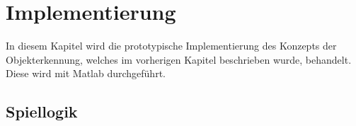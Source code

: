 
\chapter{Implementierung}\label{cha:Implementierung}
In diesem Kapitel wird die prototypische Implementierung des Konzepts der Objekterkennung, welches im vorherigen Kapitel beschrieben wurde, behandelt. Diese wird mit Matlab durchgeführt.
\section{Spiellogik}\label{sec:Spiellogik}